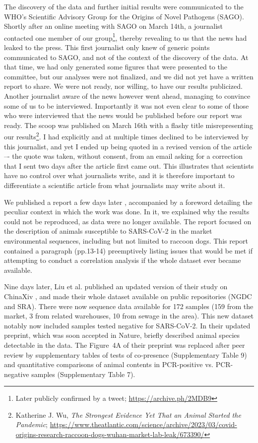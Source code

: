 \documentclass[11pt]{article}
\def \sct {\mbox{SARS-CoV-2}}
\begin{document}
The discovery of the data and further initial results were communicated to the WHO's Scientific Advisory Group for the Origins of Novel Pathogens (SAGO). Shortly after an online meeting with SAGO on March 14th, a journalist contacted one member of our group\footnote{Later publicly confirmed by a tweet; \url{https://archive.ph/2MDB9}}, thereby revealing to us that the news had leaked to the press. This first journalist only knew of generic points communicated to SAGO, and not of the context of the discovery of the data. At that time, we had only generated some figures that were presented to the committee, but our analyses were not finalized, and we did not yet have a written report to share. We were not ready, nor willing, to have our results publicized. Another journalist aware of the news however went ahead, managing to convince some of us to be interviewed. Importantly it was not even clear to some of those who were interviewed that the news would be published before our report was ready. The scoop was published on March 16th with a flashy title misrepresenting our results\footnote{\label{foot:wu}Katherine J. Wu, \textit{The Strongest Evidence Yet That an Animal Started the Pandemic}; \url{https://www.theatlantic.com/science/archive/2023/03/covid-origins-research-raccoon-dogs-wuhan-market-lab-leak/673390/}\par}. I had explicitly and at multiple times declined to be interviewed by this journalist, and yet I ended up being quoted in a revised version of the article –- the quote was taken, without consent, from an email asking for a correction that I sent two days after the article first came out. This illustrates that scientists have no control over what journalists write, and it is therefore important to differentiate a scientific article from what journalists may write about it.

We published a report a few days later \citep{ACC2023Zenodo}, accompanied by a foreword detailing the peculiar context in which the work was done. In it, we explained why the results could not be reproduced, as data were no longer available. The report focused on the description of animals susceptible to \sct{} in the market environmental sequences, including but not limited to raccoon dogs. This report contained a paragraph (pp.13-14) preemptively listing issues that would be met if attempting to conduct a correlation analysis if the whole dataset ever became available.
 
Nine days later, Liu et al. published an updated version of their study on ChinaXiv \citep{Liu2023ChinaXiv}, and made their whole dataset available on public repositories (NGDC and SRA). There were now sequence data available for 172 samples (159 from the market, 3 from related warehouses, 10 from sewage in the area). This new dataset notably now included samples tested negative for \sct{}. In their updated preprint, which was soon accepted in Nature, \citet{Liu2023Nature} briefly described animal species detectable in the data. The Figure~4A of their preprint was replaced after peer review by supplementary tables of tests of co-presence (Supplementary Table 9) and quantitative comparisons of animal contents in PCR-positive vs. PCR-negative samples (Supplementary Table 7). 
\end{document}
